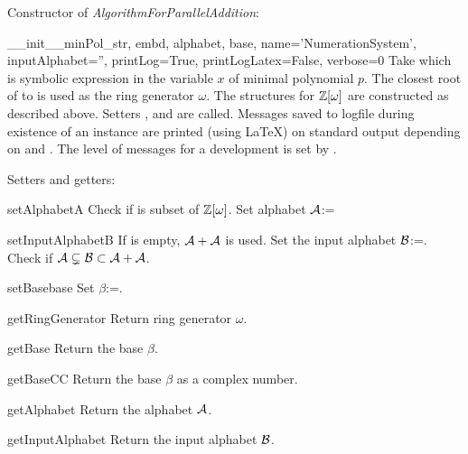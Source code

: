 Constructor of \emph{AlgorithmForParallelAddition}:

\begin{method}{\_\_init\_\_}{minPol\_str, embd, alphabet, base, name='NumerationSystem', inputAlphabet='', printLog=True, printLogLatex=False, verbose=0}
Take  which is symbolic expression in the variable $x$ of minimal polynomial $p$. The closest root of   to  is used as the ring generator $\omega$. The structures for $\mathbb{Z}[\omega]$ are constructed as described above. Setters ,  and  are called. Messages saved to logfile during existence of an instance are printed (using \LaTeX) on standard output depending on  and . The level of messages for a development is set by . 
\end{method}

Setters and getters:

\begin{method}{setAlphabet}{A}
Check if  is subset of $\mathbb{Z}[\omega]$. Set alphabet $\mathcal{A}$:=
\end{method}

\begin{method}{setInputAlphabet}{B}
If  is empty, $\mathcal{A}+\mathcal{A}$ is used. Set the input alphabet $\mathcal{B}$:=. Check if $\mathcal{A}\subsetneq\mathcal{B}\subset\mathcal{A}+\mathcal{A}$. 
\end{method}

\begin{method}{setBase}{base}
Set $\beta$:=.
\end{method}

\begin{method}{getRingGenerator}{}
Return ring generator $\omega$.
\end{method}

\begin{method}{getBase}{}
Return the base $\beta$.
\end{method}

\begin{method}{getBaseCC}{}
Return the base $\beta$ as a complex number.
\end{method}

\begin{method}{getAlphabet}{}
Return the alphabet $\mathcal{A}$.
\end{method}

\begin{method}{getInputAlphabet}{}
Return the input alphabet $\mathcal{B}$.
\end{method}

